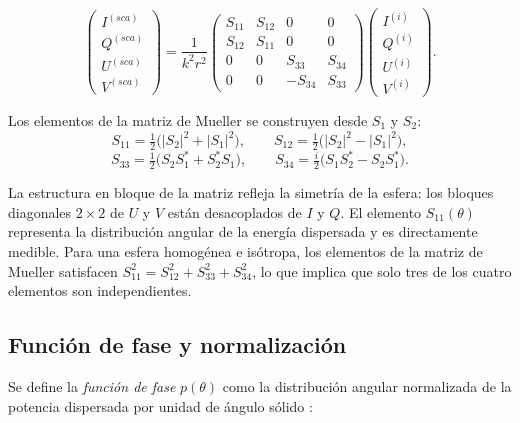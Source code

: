 \begin{equation}
  \label{eq:MuellerMatrix}
  \begin{pmatrix} I^{(sca)} \\ Q^{(sca)} \\ U^{(sca)} \\ V^{(sca)} \end{pmatrix}
  =
  \frac{1}{k^2 r^2}
  \begin{pmatrix}
    S_{11} & S_{12} & 0      & 0      \\
    S_{12} & S_{11} & 0      & 0      \\
    0      & 0      & S_{33} & S_{34} \\
    0      & 0      &-S_{34} & S_{33}
  \end{pmatrix}
  \begin{pmatrix} I^{(i)} \\ Q^{(i)} \\ U^{(i)} \\ V^{(i)} \end{pmatrix}.
\end{equation}

Los elementos de la matriz de Mueller se construyen desde $S_1$ y $S_2$:
\begin{equation}
  \label{eq:MuellerElements}
  S_{11} = \tfrac{1}{2}\bigl(|S_2|^2 + |S_1|^2\bigr),
  \qquad
  S_{12} = \tfrac{1}{2}\bigl(|S_2|^2 - |S_1|^2\bigr),
\end{equation}
\begin{equation}
  \label{eq:MuellerElements2}
  S_{33} = \tfrac{1}{2}\bigl(S_2 S_1^* + S_2^* S_1\bigr),
  \qquad
  S_{34} = \tfrac{i}{2}\bigl(S_1 S_2^* - S_2 S_1^*\bigr).
\end{equation}

La estructura en bloque de la matriz refleja la simetría de la esfera: los
bloques diagonales $2\times 2$ de $U$ y $V$ están desacoplados de $I$ y $Q$.
El elemento $S_{11}(\theta)$ representa la distribución angular 
de la energía dispersada y es directamente medible. 
Para una esfera homogénea e isótropa, los elementos de la matriz de Mueller
satisfacen $S_{11}^2 = S_{12}^2 + S_{33}^2 + S_{34}^2$,
lo que implica que solo tres de los cuatro elementos son independientes.

\subsection{Función de fase y normalización}
\label{sec:fase}
Se define la \textit{función de fase} $p(\theta)$ como la distribución angular
normalizada de la potencia dispersada por unidad de ángulo sólido
\cite[cap.~2]{Mishchenko2002}:

